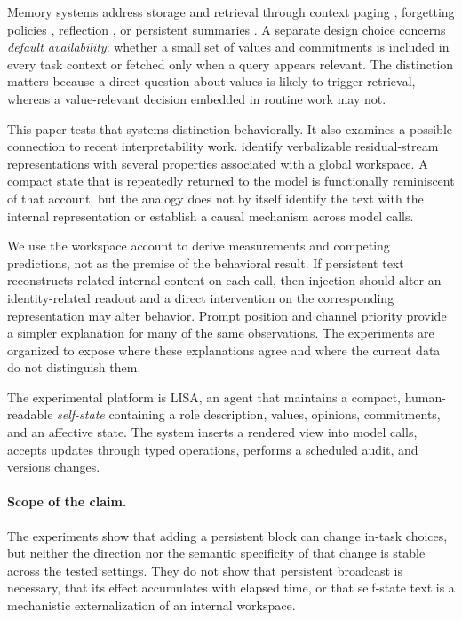 \documentclass[11pt]{article}
\begin{document}
Memory systems address storage and retrieval through context paging \citep{packer2023}, forgetting policies \citep{zhong2024memorybank}, reflection \citep{park2023}, or persistent summaries \citep{karimi2026engram}. A separate design choice concerns \emph{default availability}: whether a small set of values and commitments is included in every task context or fetched only when a query appears relevant. The distinction matters because a direct question about values is likely to trigger retrieval, whereas a value-relevant decision embedded in routine work may not.

This paper tests that systems distinction behaviorally. It also examines a possible connection to recent interpretability work. \citet{gurnee2026} identify verbalizable residual-stream representations with several properties associated with a global workspace. A compact state that is repeatedly returned to the model is functionally reminiscent of that account, but the analogy does not by itself identify the text with the internal representation or establish a causal mechanism across model calls.

We use the workspace account to derive measurements and competing predictions, not as the premise of the behavioral result. If persistent text reconstructs related internal content on each call, then injection should alter an identity-related readout and a direct intervention on the corresponding representation may alter behavior. Prompt position and channel priority provide a simpler explanation for many of the same observations. The experiments are organized to expose where these explanations agree and where the current data do not distinguish them.

The experimental platform is LISA, an agent that maintains a compact, human-readable \emph{self-state} containing a role description, values, opinions, commitments, and an affective state. The system inserts a rendered view into model calls, accepts updates through typed operations, performs a scheduled audit, and versions changes.

\paragraph{Scope of the claim.} The experiments show that adding a persistent block can change in-task choices, but neither the direction nor the semantic specificity of that change is stable across the tested settings. They do not show that persistent broadcast is necessary, that its effect accumulates with elapsed time, or that self-state text is a mechanistic externalization of an internal workspace.
\end{document}
